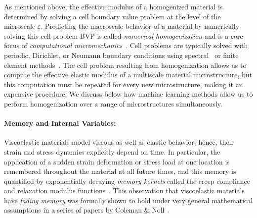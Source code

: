 As mentioned above, the effective modulus of a homogenized material is determined by solving a cell boundary value problem at the level of the microscale $\varepsilon$. Predicting the macroscale behavior of a material by numerically solving this cell problem BVP is called \textit{numerical homogenization} and is a core focus of \textit{computational micromechanics}~\cite{zohdi2008introduction}. Cell problems are typically solved with periodic, Dirichlet, or Neumann boundary conditions using spectral~\cite{mishra2016comparative, moulinec1998numerical} or finite element methods~\cite{guedes1990preprocessing, suquet1987elements}. The cell problem resulting from homogenization allows us to compute the effective elastic modulus of a multiscale material microstructure, but this computation must be repeated for every new microstructure, making it an expensive procedure. We discuss below how machine learning methods allow us to perform homogenization over a range of microstructures simultaneously.~\\

\paragraph{Memory and Internal Variables:}
Viscoelastic materials model viscous as well as elastic behavior; hence, their strain and stress dynamics explicitly depend on time. In particular, the application of a sudden strain deformation or stress load at one location is remembered throughout the material at all future times, and this memory is quantified by exponentially decaying \textit{memory kernels} called the creep compliance and relaxation modulus functions~\cite{ferry1980viscoelastic, tschoegl2012phenomenological}. This observation that viscoelastic materials have \textit{fading memory} was formally shown to hold under very general mathematical assumptions in a series of papers by Coleman \& Noll~\cite{coleman1961foundations, coleman1961recent}.

